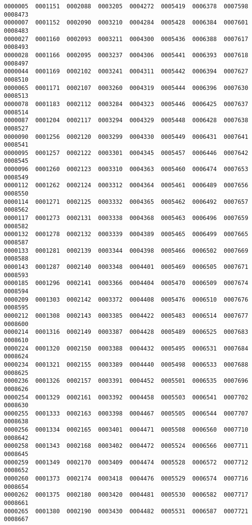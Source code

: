 \documentclass[11pt]{article}
\begin{document}
    \begin{Verbatim}[commandchars=\\\{\}]
0000005  0001151  0002088  0003205  0004272  0005419  0006378  0007598	0008473
0000007  0001152  0002090  0003210  0004284  0005428  0006384  0007601	0008483
0000027  0001160  0002093  0003211  0004300  0005436  0006388  0007617	0008493
0000028  0001166  0002095  0003237  0004306  0005441  0006393  0007618	0008497
0000044  0001169  0002102  0003241  0004311  0005442  0006394  0007627	0008510
0000065  0001171  0002107  0003260  0004319  0005444  0006396  0007630	0008513
0000078  0001183  0002112  0003284  0004323  0005446  0006425  0007637	0008514
0000087  0001204  0002117  0003294  0004329  0005448  0006428  0007638	0008527
0000090  0001256  0002120  0003299  0004330  0005449  0006431  0007641	0008541
0000095  0001257  0002122  0003301  0004345  0005457  0006446  0007642	0008545
0000096  0001260  0002123  0003310  0004363  0005460  0006474  0007653	0008549
0000112  0001262  0002124  0003312  0004364  0005461  0006489  0007656	0008550
0000114  0001271  0002125  0003332  0004365  0005462  0006492  0007657	0008562
0000117  0001273  0002131  0003338  0004368  0005463  0006496  0007659	0008582
0000132  0001278  0002132  0003339  0004389  0005465  0006499  0007665	0008587
0000133  0001281  0002139  0003344  0004398  0005466  0006502  0007669	0008588
0000143  0001287  0002140  0003348  0004401  0005469  0006505  0007671	0008593
0000185  0001296  0002141  0003366  0004404  0005470  0006509  0007674	0008594
0000209  0001303  0002142  0003372  0004408  0005476  0006510  0007676	0008595
0000212  0001308  0002143  0003385  0004422  0005483  0006514  0007677	0008600
0000214  0001316  0002149  0003387  0004428  0005489  0006525  0007683	0008610
0000224  0001320  0002150  0003388  0004432  0005495  0006531  0007684	0008624
0000234  0001321  0002155  0003389  0004440  0005498  0006533  0007688	0008625
0000236  0001326  0002157  0003391  0004452  0005501  0006535  0007696	0008626
0000254  0001329  0002161  0003392  0004458  0005503  0006541  0007702	0008630
0000255  0001333  0002163  0003398  0004467  0005505  0006544  0007707	0008638
0000256  0001334  0002165  0003401  0004471  0005508  0006560  0007710	0008642
0000258  0001343  0002168  0003402  0004472  0005524  0006566  0007711	0008645
0000259  0001349  0002170  0003409  0004474  0005528  0006572  0007712	0008652
0000260  0001373  0002174  0003418  0004476  0005529  0006574  0007716	0008654
0000262  0001375  0002180  0003420  0004481  0005530  0006582  0007717	0008661
0000265  0001380  0002190  0003430  0004482  0005531  0006587  0007721	0008667

\end{Verbatim}
\end{document}
